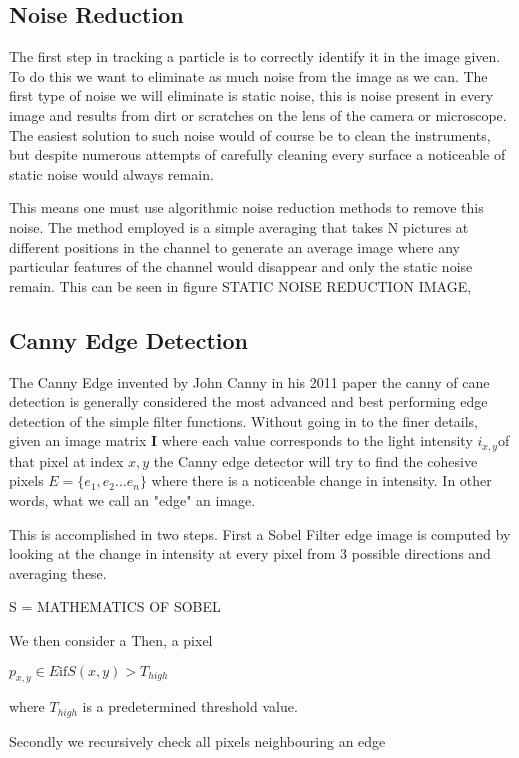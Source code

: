 

\subsection{Noise Reduction}
The first step in tracking a particle is to correctly identify it in the image given. To do this we want to eliminate as much noise from the image as we can. The first type of noise we will eliminate is static noise, this is noise present in every image and results from dirt or scratches on the lens of the camera or microscope. 
The easiest solution to such noise would of course be to clean the instruments, but despite numerous attempts of carefully cleaning every surface a noticeable of static noise would always remain. 

This means one must use algorithmic noise reduction methods to remove this noise. The method employed is a simple averaging that takes N pictures at different positions in the channel to generate an average image where any particular features of the channel would disappear and only the static noise remain. This can be seen in figure STATIC NOISE REDUCTION IMAGE,


\subsection{Canny Edge Detection}
The Canny Edge invented by John Canny in his 2011 paper the canny of cane detection is generally considered the most advanced and best performing edge detection of the simple filter functions. 
Without going in to the finer details, given an image matrix $\mathbf{I}$ where each value corresponds to the light intensity $i_{x,y}$of that pixel at index $x,y$ the Canny edge detector will try to find the cohesive pixels $E = \{e_1, e_2... e_n\}$ where there is a noticeable change in intensity. In other words, what we call an "edge" an image. 

This is accomplished in two steps. First a Sobel Filter edge image is computed by looking at the change in intensity at every pixel from 3 possible directions and averaging these. 

S = MATHEMATICS OF SOBEL

We then consider a Then, a pixel 

$p_{x,y} \in E \text{if} S(x,y) > T_{high}$

where $T_{high}$ is a predetermined threshold value. 

Secondly we recursively check all pixels neighbouring an edge

